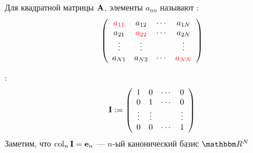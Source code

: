 \begin{frame}
    
    \vspace{2em}
    Для квадратной матрицы $\mathbf A$, элементы $a_{nn}$ называют :
    \begin{equation*}
        \left(
        \begin{array}{cccc}
            \textcolor{red}{a_{11}} & a_{12} & \cdots & a_{1N} \\
            a_{21} & \textcolor{red}{a_{22}} & \cdots & a_{2N} \\
            \vdots & \vdots &  & \vdots \\
            a_{N1} & a_{N2} & \cdots & \textcolor{red}{a_{NN}} \\
        \end{array}
        \right)
    \end{equation*}

    :
    \begin{equation*}
        \mathbf I := 
        \left(
        \begin{array}{cccc}
            1 & 0 & \cdots & 0 \\
            0 & 1 & \cdots & 0 \\
            \vdots & \vdots &  & \vdots \\
            0 & 0 & \cdots & 1 \\
        \end{array}
        \right)
    \end{equation*}
    Заметим, что $\operatorname{col}_n \mathbf I = {\mathbf e}_n$ --- $n$-ый канонический базис $\RR^N$
    

\end{frame}

